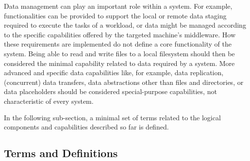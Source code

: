 \documentclass{sig-alternate}
\begin{document}
Data management can play an important role within a \pilotjob system. For
example, functionalities can be provided to support the local or remote data
staging required to execute the tasks of a workload, or data might be managed
according to the specific capabilities offered by the targeted machine's
middleware. How these requirements are implemented do not
define a core functionality of the \pilot system.
Being able to read and write files to a local filesystem should then be
considered the minimal capability related to data required by a \pilotjob
system. More advanced and specific data capabilities like, for example, data
replication, (concurrent) data transfers, data abstractions other than files and
directories, or data placeholders should be considered special-purpose
capabilities, not characteristic of every \pilotjob system.   

In the following sub-section, a minimal set of terms related to the logical
components and capabilities described so far is defined.

\subsection{Terms and Definitions}
\label{sec:termsdefs}

\end{document}
